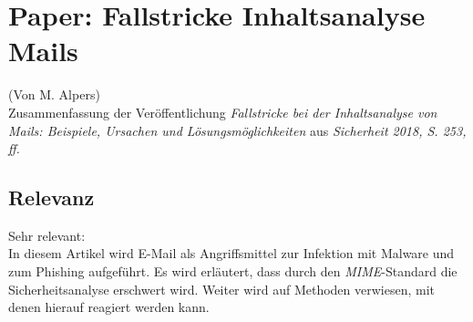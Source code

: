 \section{Paper: Fallstricke Inhaltsanalyse Mails}
(Von M. Alpers)\\

Zusammenfassung der Veröffentlichung \emph{Fallstricke bei der Inhaltsanalyse von Mails: Beispiele, Ursachen und Lösungsmöglichkeiten} aus \emph{Sicherheit 2018, S. 253, ff.}\\

\subsection{Relevanz}

Sehr relevant:\\

In diesem Artikel wird E-Mail als Angriffsmittel \glqq{}zur Infektion mit Malware und zum Phishing\grqq{} aufgeführt. Es wird erläutert, dass durch den \emph{MIME}-Standard die Sicherheitsanalyse erschwert wird. Weiter wird auf Methoden verwiesen, mit denen hierauf reagiert werden kann.